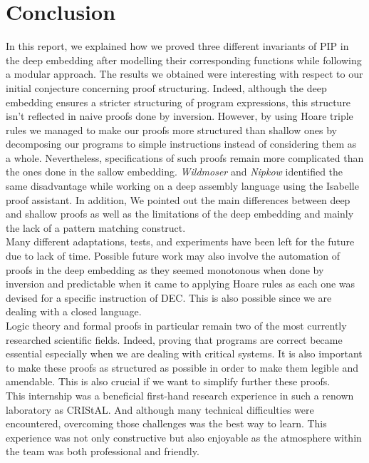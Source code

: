 \chapter{Conclusion}
In this report, we explained how we proved three different invariants of PIP in the deep embedding after modelling their corresponding functions while following a modular approach. The results we obtained were interesting with respect to our initial conjecture concerning proof structuring. Indeed, although the deep embedding ensures a stricter structuring of program expressions, this structure isn't reflected in naive proofs done by inversion. However, by using Hoare triple rules we managed to make our proofs more structured than shallow ones by decomposing our programs to simple instructions instead of considering them as a whole. Nevertheless, specifications of such proofs remain more complicated than the ones done in the sallow embedding. \textit{Wildmoser} and \textit{Nipkow} identified the same disadvantage while working on a deep assembly language using the Isabelle proof assistant\cite{Wildmoser}. In addition, We pointed out the main differences between deep and shallow proofs as well as the limitations of the deep embedding and mainly the lack of a pattern matching construct. \\

Many different adaptations, tests, and experiments have been left for the future due to lack of time. Possible future work may also involve the automation of proofs in the deep embedding as they seemed monotonous when done by inversion and predictable when it came to applying Hoare rules as each one was devised for a specific instruction of DEC. This is also possible since we are dealing with a closed language. \\

Logic theory and formal proofs in particular remain two of the most currently researched scientific fields. Indeed, proving that programs are correct became essential especially when we are dealing with critical systems. It is also important to make these proofs as structured as possible in order to make them legible and amendable. This is also crucial if we want to simplify further these proofs.  \\   

This internship was a beneficial first-hand research experience in such a renown laboratory as CRIStAL. And although many technical difficulties were encountered, overcoming those challenges was the best way to learn. This experience was not only  constructive but also enjoyable as the atmosphere within the team was both professional and friendly. \\ 